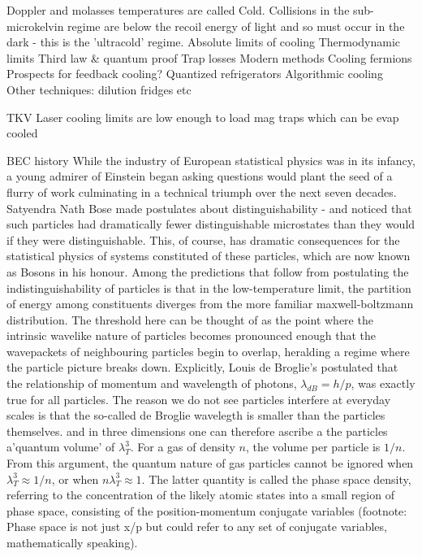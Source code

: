 	Doppler and molasses temperatures are called Cold.
	Collisions in the sub-microkelvin regime are below the recoil energy of light and so must occur in the dark - this is the 'ultracold' regime.
	Absolute limits of cooling Thermodynamic limits Third law \& quantum	proof Trap losses Modern methods Cooling fermions Prospects for feedback	cooling? Quantized refrigerators Algorithmic cooling Other techniques:	dilution fridges etc
	
	TKV Laser cooling limits are low enough to load mag traps which can be evap cooled


	BEC history
	While the industry of European statistical physics was in its infancy, a	young admirer of Einstein began asking questions would plant the seed of	a flurry of work culminating in a technical triumph over the next seven	decades.
	Satyendra Nath Bose made postulates about distinguishability -	and noticed that such particles had dramatically fewer distinguishable	microstates than they would if they were distinguishable.
	This, of	course, has dramatic consequences for the statistical physics of systems	constituted of these particles, which are now known as Bosons in his	honour.
	Among the predictions that follow from postulating the	indistinguishability of particles is that in the low-temperature limit,	the partition of energy among constituents diverges from the more familiar maxwell-boltzmann distribution.
	The threshold here can be thought of as	the point where the intrinsic wavelike nature of particles becomes	pronounced enough that the wavepackets of neighbouring particles begin	to overlap, heralding a regime where the particle picture breaks down.	Explicitly, Louis de Broglie's postulated that the relationship of	momentum and wavelength of photons, $\lambda_{dB} = h/p$, was exactly	true for all particles.
	The reason we do not see particles interfere at	everyday scales is that the so-called de Broglie wavelegth is smaller	than the particles themselves.
	and in three dimensions one can therefore ascribe a the particles	a'quantum volume' of $\lambda_T^3$.
	For a gas of density $n$, the	volume per particle is $1/n$.
	From this argument, the quantum nature	of gas particles cannot be ignored when $\lambda_T^3 \approx 1/n$,	or when $n\lambda_T^3\approx 1$.
	The latter quantity is called the	phase space density, referring to the concentration of the likely atomic	states into a small region of phase space, consisting of the	position-momentum conjugate variables (footnote: Phase space is not just	x/p but could refer to any set of conjugate variables, mathematically	speaking).

